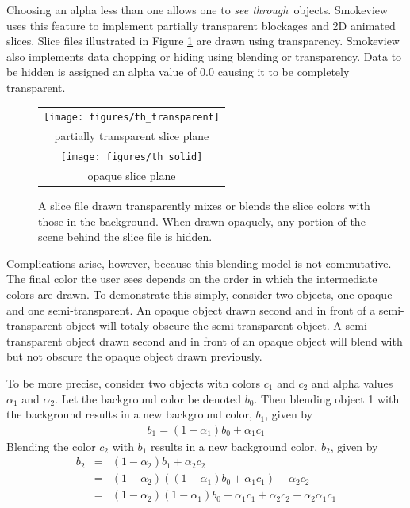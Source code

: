 \documentclass[11pt,twoside]{book}
\newcommand{\figoptions}{htp}
\begin{document}
Choosing an alpha less than one allows one to
{\em see through}\ objects. Smokeview uses this feature to implement
partially transparent blockages and 2D animated slices.
Slice files illustrated in Figure
\ref{figtransparent} are drawn using transparency. Smokeview also implements
data chopping or hiding using blending or transparency.  Data to be hidden is assigned an alpha
value of 0.0 causing it to be completely transparent.

\begin{figure}[\figoptions]
\begin{center}
\begin{tabular}{c}
\texttt{[image: figures/th\_transparent]}\\
partially transparent slice plane\\
\texttt{[image: figures/th\_solid]}\\
opaque slice plane\\
\end{tabular}
\end{center}
\caption {A slice file drawn transparently mixes or blends the
slice colors with those in the background.  When drawn opaquely,
any portion of the scene behind the slice file is hidden. }
\label{figtransparent}
\end{figure}

Complications arise, however, because this blending model is not commutative.  The final color the user sees depends on the order in which the intermediate colors are drawn. To demonstrate this simply, consider two objects, one opaque and one semi-transparent.  An opaque object drawn second and in front of a semi-transparent object will totaly obscure the semi-transparent object. A semi-transparent object drawn second and in front of an opaque object will blend with but not obscure the opaque object drawn previously.

To be more precise, consider two objects with colors $c_1$ and $c_2$ and alpha values $\alpha_1$ and $\alpha_2$.   Let the background color be denoted $b_0$.  Then blending object 1 with the background results in a new background color, $b_1$, given by
\begin{eqnarray*}
b_1=(1-\alpha_1)b_0 + \alpha_1c_1
\end{eqnarray*}
Blending the color $c_2$ with $b_1$ results in a new background color, $b_2$, given by
\begin{eqnarray*}
b_2&=&(1-\alpha_2)b_1 + \alpha_2c_2\\
&=&(1-\alpha_2)((1-\alpha_1)b_0 + \alpha_1c_1)+\alpha_2c_2\\
&=&(1-\alpha_2)(1-\alpha_1)b_0 + \alpha_1c_1 + \alpha_2c_2 - \alpha_2\alpha_1c_1
\end{eqnarray*}
\end{document}
